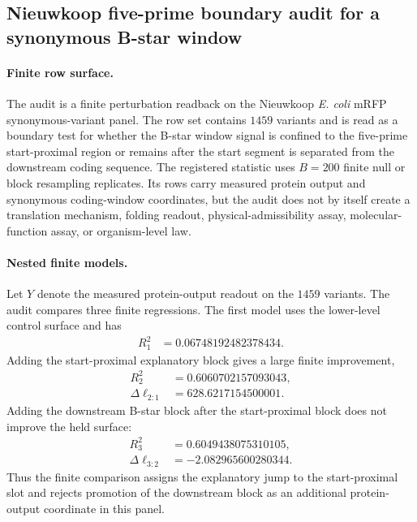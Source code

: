\subsection{Nieuwkoop five-prime boundary audit for a synonymous B-star window}
\label{sec:bioreality-nieuwkoop-five-prime-boundary-audit}

\paragraph{Finite row surface.}
The audit is a finite perturbation readback on the Nieuwkoop \emph{E. coli} mRFP synonymous-variant panel.  The row set contains $1459$ variants and is read as a boundary test for whether the B-star window signal is confined to the five-prime start-proximal region or remains after the start segment is separated from the downstream coding sequence.  The registered statistic uses $B=200$ finite null or block resampling replicates.  Its rows carry measured protein output and synonymous coding-window coordinates, but the audit does not by itself create a translation mechanism, folding readout, physical-admissibility assay, molecular-function assay, or organism-level law.

\paragraph{Nested finite models.}
Let $Y$ denote the measured protein-output readout on the $1459$ variants.  The audit compares three finite regressions.  The first model uses the lower-level control surface and has
$$
\begin{aligned}
R^2_{1} &= 0.06748192482378434 .
\end{aligned}
$$
Adding the start-proximal explanatory block gives a large finite improvement,
$$
\begin{aligned}
R^2_{2} &= 0.6060702157093043,\\
\Delta \ell_{2:1} &= 628.6217154500001 .
\end{aligned}
$$
Adding the downstream B-star block after the start-proximal block does not improve the held surface:
$$
\begin{aligned}
R^2_{3} &= 0.6049438075310105,\\
\Delta \ell_{3:2} &= -2.082965600280344 .
\end{aligned}
$$
Thus the finite comparison assigns the explanatory jump to the start-proximal slot and rejects promotion of the downstream block as an additional protein-output coordinate in this panel.

